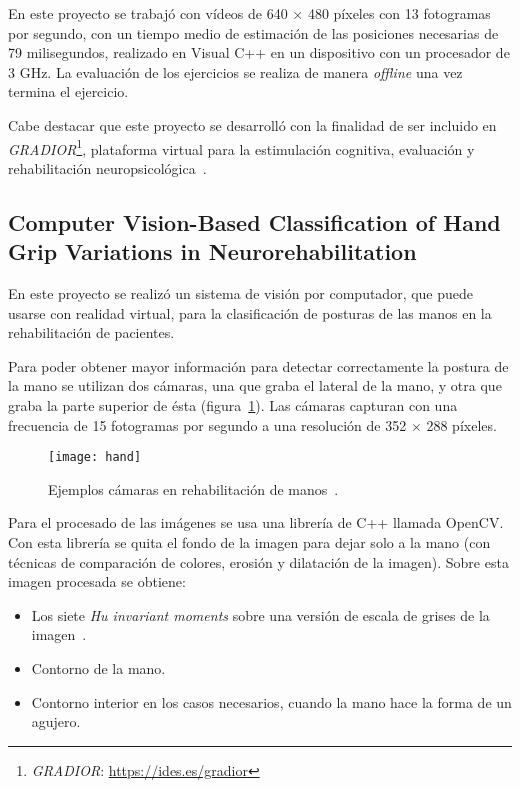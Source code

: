 En este proyecto se trabajó con vídeos de 640 × 480 píxeles con 13 fotogramas por segundo, con un tiempo medio de estimación de las posiciones necesarias de 79 milisegundos, realizado en Visual C++ en un dispositivo con un procesador de 3 GHz. La evaluación de los ejercicios se realiza de manera \textit{offline} una vez termina el ejercicio. 

Cabe destacar que este proyecto se desarrolló con la finalidad de ser incluido en \textit{GRADIOR}\footnote{\textit{GRADIOR}: \url{https://ides.es/gradior}}, plataforma virtual para la estimulación cognitiva, evaluación y rehabilitación neuropsicológica~\cite{gradior}.

\subsection{Computer Vision-Based Classification of Hand Grip Variations in Neurorehabilitation~\cite{hand}}
En este proyecto se realizó un sistema de visión por computador, que puede usarse con realidad virtual, para la clasificación de posturas de las manos en la rehabilitación de pacientes.

Para poder obtener mayor información para detectar correctamente la postura de la mano se utilizan dos cámaras, una que graba el lateral de la mano, y otra que graba la parte superior de ésta (figura~\ref{fig:hand}). Las cámaras capturan con una frecuencia de 15 fotogramas por segundo a una resolución de 352 $\times$ 288 píxeles.

\begin{figure}[h]
	\centering
	\texttt{[image: hand]}
	\caption{Ejemplos cámaras en rehabilitación de manos~\cite{hand}.}
	\label{fig:hand}
\end{figure}

Para el procesado de las imágenes se usa una librería de C++ llamada OpenCV. Con esta librería se quita el fondo de la imagen para dejar solo a la mano (con técnicas de comparación de colores, erosión y dilatación de la imagen). Sobre esta imagen procesada se obtiene:
\begin{itemize}
	\item Los siete \textit{Hu invariant moments} sobre una versión de escala de grises de la imagen~\cite{humingkuei2011}.
	\item Contorno de la mano.
	\item Contorno interior en los casos necesarios, cuando la mano hace la forma de un agujero.
\end{itemize}

